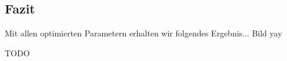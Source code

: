 \subsection{Fazit}

Mit allen optimierten Parametern erhalten wir folgendes Ergebnis... Bild yay

TODO